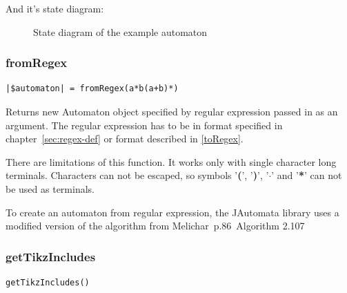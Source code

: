 \documentclass{ctuthesis}
\begin{document}
And it's state diagram:
\begin{figure}[H]
\caption{State diagram of the example automaton}
\label{fig:example_automaton_diagram}
\end{figure}

\subsubsection{fromRegex}
\label{fromRegex}
\begin{lstlisting}[language = JASL_snippet]
	|$automaton| = fromRegex(a*b(a+b)*)
\end{lstlisting}

Returns new Automaton object specified by regular expression passed in as an argument. The regular expression has to be in format specified in chapter~\ref{sec:regex-def} or format described in \ref{toRegex}.

There are limitations of this function. It works only with single character long terminals. Characters can not be escaped, so symbols '\textbf{(}', '\textbf{)}', '$\mathbf{\cdot}$' and '\textbf{*}' can not be used as terminals. 

To create an automaton from regular expression, the JAutomata library uses a modified version of the algorithm from Melichar~p.86~Algorithm 2.107~\cite{melichar}

\subsubsection{getTikzIncludes}
\label{subsec:getTikzIncludes}
\begin{lstlisting}[language = JASL_snippet]
	getTikzIncludes()
\end{lstlisting}
\end{document}
